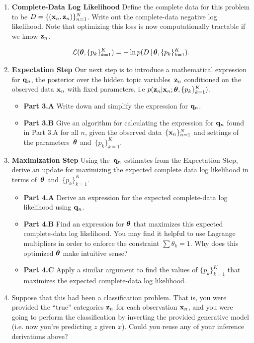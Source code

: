 \documentclass[submit]{harvardml}
\begin{document}
\begin{problem}
\begin{enumerate}
\item \textbf{Complete-Data Log Likelihood} Define the complete data
  for this problem to be $D = \{(\mathbf{x}_n, \mathbf{z}_n)\}_{n=1}^N$. Write
  out the complete-data negative log likelihood. Note that optimizing
  this loss is now computationally tractable if we know $\mathbf{z}_n$.

\[\mathcal{L}(\boldsymbol{\theta}, \{p_k\}^K_{k=1}) =  -\ln p(D \,|\,\boldsymbol{\theta}, \{p_k\}^K_{k=1}).\]


\item \textbf{Expectation Step} Our next step is to introduce a
  mathematical expression for $\mathbf{q}_n$, the posterior over the
  hidden topic variables~$\mathbf{z}_n$ conditioned on the observed data
  $\mathbf{x}_n$ with fixed parameters, i.e $p(\mathbf{z}_n | \mathbf{x}_n;
  \boldsymbol{\theta}, \{ p_k \}^K_{k=1})$.

\begin{itemize}
\item  \textbf{Part 3.A } Write down and simplify the expression for $\mathbf{q}_n$.
\item  \textbf{Part 3.B } Give an algorithm for calculating the expression for $\mathbf{q}_n$ found in Part 3.A for all $n$, given the observed data~$\{\mathbf{x}_n\}^N_{n=1}$ and settings of the parameters~$\boldsymbol{\theta}$ and~$\{ p_k\}^K_{k=1}$.

\end{itemize}

\item \textbf{Maximization Step}
Using the~$\mathbf{q}_n$ estimates from the Expectation Step, derive an update for maximizing the expected complete data log likelihood in terms of~$\boldsymbol{\theta}$ and~$\{ p_k \}^K_{k=1}$.

\begin{itemize}
    \item \textbf{Part 4.A } Derive an expression for the expected complete-data log likelihood using $\mathbf{q}_n$.
    \item \textbf{Part 4.B } Find an expression for $\boldsymbol{\theta}$ that maximizes this expected complete-data log likelihood. You may find it helpful to use Lagrange multipliers in order to enforce the constraint $\sum \theta_k = 1$. Why does this optimized $\boldsymbol{\theta}$ make intuitive sense?
    \item \textbf{Part 4.C } Apply a similar argument to find the
      values of $\{p_k \}^K_{k = 1}$ that maximizes the expected
      complete-data log likelihood.
\end{itemize}

\item Suppose that this had been a classification problem. That is,
  you were provided the ``true'' categories $\mathbf{z}_n$ for each observation $\mathbf{x}_n$,
  and you were going to perform the classification by
  inverting the provided generative model (i.e. now you're predicting $z$ given $x$). Could you reuse any of
  your inference derivations above?


\end{enumerate}
\end{problem}
\end{document}
